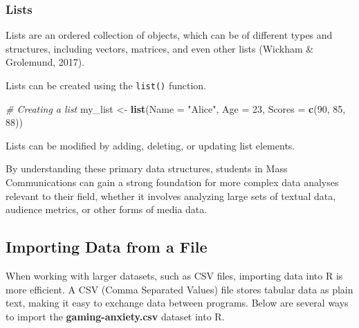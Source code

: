 \documentclass[
]{book}
\newenvironment{Shaded}{\begin{snugshade}}{\end{snugshade}}
\newcommand{\AttributeTok}[1]{\textcolor[rgb]{0.13,0.29,0.53}{#1}}
\newcommand{\CommentTok}[1]{\textcolor[rgb]{0.56,0.35,0.01}{\textit{#1}}}
\newcommand{\DecValTok}[1]{\textcolor[rgb]{0.00,0.00,0.81}{#1}}
\newcommand{\FunctionTok}[1]{\textcolor[rgb]{0.13,0.29,0.53}{\textbf{#1}}}
\newcommand{\NormalTok}[1]{#1}
\newcommand{\OtherTok}[1]{\textcolor[rgb]{0.56,0.35,0.01}{#1}}
\newcommand{\SpecialCharTok}[1]{\textcolor[rgb]{0.81,0.36,0.00}{\textbf{#1}}}
\newcommand{\StringTok}[1]{\textcolor[rgb]{0.31,0.60,0.02}{#1}}
\begin{document}
\subsubsection*{Lists}\label{lists}

Lists are an ordered collection of objects, which can be of different types and structures, including vectors, matrices, and even other lists (Wickham \& Grolemund, 2017).

Lists can be created using the \texttt{list()} function.

\begin{Shaded}
\begin{Highlighting}[]
\CommentTok{\# Creating a list}
\NormalTok{my\_list }\OtherTok{\textless{}{-}} \FunctionTok{list}\NormalTok{(}\AttributeTok{Name =} \StringTok{"Alice"}\NormalTok{, }\AttributeTok{Age =} \DecValTok{23}\NormalTok{, }\AttributeTok{Scores =} \FunctionTok{c}\NormalTok{(}\DecValTok{90}\NormalTok{, }\DecValTok{85}\NormalTok{, }\DecValTok{88}\NormalTok{))}
\end{Highlighting}
\end{Shaded}

Lists can be modified by adding, deleting, or updating list elements.

\begin{Shaded}
\end{Shaded}

By understanding these primary data structures, students in Mass Communications can gain a strong foundation for more complex data analyses relevant to their field, whether it involves analyzing large sets of textual data, audience metrics, or other forms of media data.

\subsection*{Importing Data from a File}\label{importing-data-from-a-file}

When working with larger datasets, such as CSV files, importing data into R is more efficient. A CSV (Comma Separated Values) file stores tabular data as plain text, making it easy to exchange data between programs. Below are several ways to import the \textbf{gaming-anxiety.csv} dataset into R.
\end{document}
